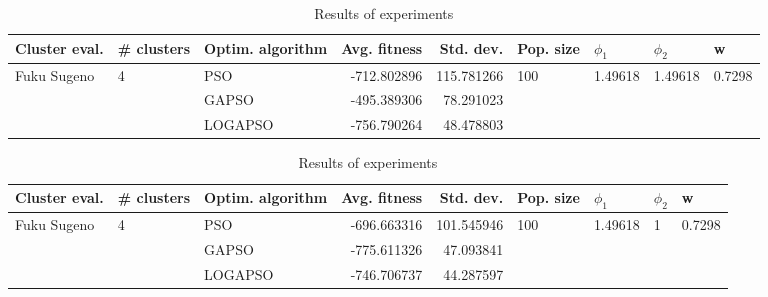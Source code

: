 \documentclass{article}
\begin{document}
\begin{table}
\centering
\caption{Results of experiments}
\begin{tabular}{lllrrllll}
\toprule
               Cluster eval. &        \# clusters & Optim. algorithm &  Avg. fitness &  Std. dev. &            Pop. size &               $\phi_{1}$ &               $\phi_{2}$ &                       w \\
\midrule
\multirow{3}{*}{Fuku Sugeno} & \multirow{3}{*}{4} &              PSO &   -712.802896 & 115.781266 & \multirow{3}{*}{100} & \multirow{3}{*}{1.49618} & \multirow{3}{*}{1.49618} & \multirow{3}{*}{0.7298} \\
                             &                    &            GAPSO &   -495.389306 &  78.291023 &                      &                          &                          &                         \\
                             &                    &          LOGAPSO &   -756.790264 &  48.478803 &                      &                          &                          &                         \\
\bottomrule
\end{tabular}
\end{table}
\begin{table}
\centering
\caption{Results of experiments}
\begin{tabular}{lllrrllll}
\toprule
               Cluster eval. &        \# clusters & Optim. algorithm &  Avg. fitness &  Std. dev. &            Pop. size &               $\phi_{1}$ &         $\phi_{2}$ &                       w \\
\midrule
\multirow{3}{*}{Fuku Sugeno} & \multirow{3}{*}{4} &              PSO &   -696.663316 & 101.545946 & \multirow{3}{*}{100} & \multirow{3}{*}{1.49618} & \multirow{3}{*}{1} & \multirow{3}{*}{0.7298} \\
                             &                    &            GAPSO &   -775.611326 &  47.093841 &                      &                          &                    &                         \\
                             &                    &          LOGAPSO &   -746.706737 &  44.287597 &                      &                          &                    &                         \\
\bottomrule
\end{tabular}
\end{table}
\end{document}
